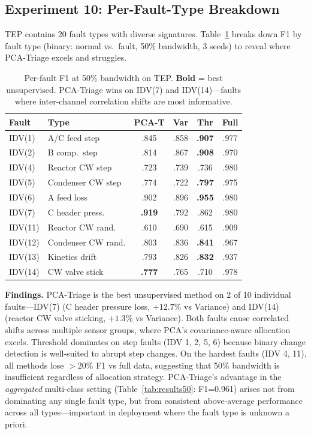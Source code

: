 \documentclass[journal]{IEEEtran}
\begin{document}
\subsection{Experiment 10: Per-Fault-Type Breakdown}

TEP contains 20 fault types with diverse signatures. Table~\ref{tab:perfault} breaks down F1 by fault type (binary: normal vs.\ fault, 50\% bandwidth, 3 seeds) to reveal where PCA-Triage excels and struggles.

\begin{table}[t]
\centering
\caption{Per-fault F1 at 50\% bandwidth on TEP. \textbf{Bold} = best unsupervised. PCA-Triage wins on IDV(7) and IDV(14)---faults where inter-channel correlation shifts are most informative.}
\begin{tabular}{@{}llcccc@{}}
\toprule
\textbf{Fault} & \textbf{Type} & \textbf{PCA-T} & \textbf{Var} & \textbf{Thr} & \textbf{Full} \\
\midrule
IDV(1) & A/C feed step & .845 & .858 & \textbf{.907} & .977 \\
IDV(2) & B comp.\ step & .814 & .867 & \textbf{.908} & .970 \\
IDV(4) & Reactor CW step & .723 & .739 & .736 & .980 \\
IDV(5) & Condenser CW step & .774 & .722 & \textbf{.797} & .975 \\
IDV(6) & A feed loss & .902 & .896 & \textbf{.955} & .980 \\
IDV(7) & C header press. & \textbf{.919} & .792 & .862 & .980 \\
IDV(11) & Reactor CW rand. & .610 & .690 & .615 & .909 \\
IDV(12) & Condenser CW rand. & .803 & .836 & \textbf{.841} & .967 \\
IDV(13) & Kinetics drift & .793 & .826 & \textbf{.832} & .937 \\
IDV(14) & CW valve stick & \textbf{.777} & .765 & .710 & .978 \\
\bottomrule
\end{tabular}
\label{tab:perfault}
\end{table}

\textbf{Findings.} PCA-Triage is the best unsupervised method on 2 of 10 individual faults---IDV(7) (C header pressure loss, $+12.7\%$ vs Variance) and IDV(14) (reactor CW valve sticking, $+1.3\%$ vs Variance). Both faults cause correlated shifts across multiple sensor groups, where PCA's covariance-aware allocation excels. Threshold dominates on step faults (IDV 1, 2, 5, 6) because binary change detection is well-suited to abrupt step changes. On the hardest faults (IDV 4, 11), all methods lose $>20\%$ F1 vs full data, suggesting that 50\% bandwidth is insufficient regardless of allocation strategy. PCA-Triage's advantage in the \textit{aggregated} multi-class setting (Table~\ref{tab:results50}: F1=0.961) arises not from dominating any single fault type, but from consistent above-average performance across all types---important in deployment where the fault type is unknown a priori.
\end{document}
